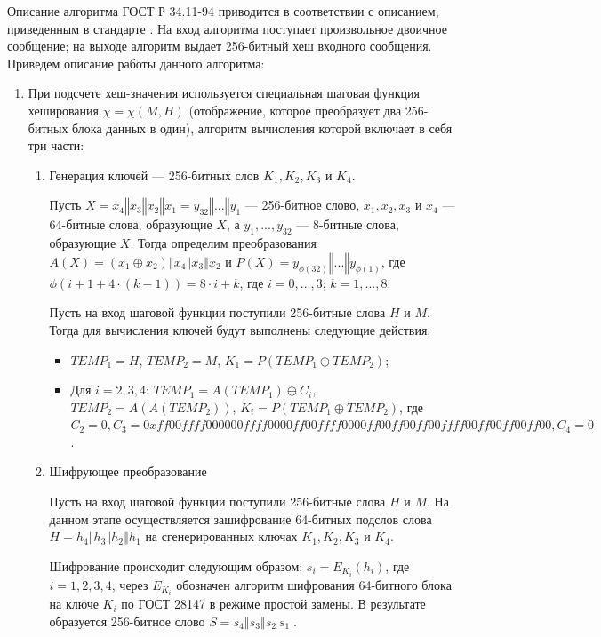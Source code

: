\documentclass{./civarticle}
\begin{document}
Описание алгоритма ГОСТ Р 34.11-94 приводится в соответствии с описанием, приведенным в стандарте \cite{gost94}. На вход алгоритма поступает произвольное двоичное сообщение; на выходе алгоритм выдает 256-битный хеш входного сообщения. Приведем описание работы данного алгоритма:

\begin{enumerate}
    \item При подсчете хеш-значения используется специальная шаговая функция хеширования $\chi = \chi(M, H)$ (отображение, которое преобразует два 256-битных блока данных в один), алгоритм вычисления которой включает в себя три части: 
    \begin{enumerate}
        \item Генерация ключей --- 256-битных слов $K_1, K_2, K_3$ и $K_4$.

        Пусть $X = x_4 \mathbin\Vert x_3 \mathbin\Vert x_2 \mathbin\Vert x_1 = y_{32} \mathbin\Vert ... \mathbin\Vert y_1$ --- 256-битное слово, $x_1, x_2, x_3$ и $x_4$ --- 64-битные слова, образующие $X$, а $y_1, ..., y_{32}$ --- 8-битные слова, образующие $X$. Тогда определим преобразования $A(X) = (x_1 \oplus x_2) \mathbin\Vert x_4 \mathbin\Vert x_3 \mathbin\Vert x_2$ и $P(X) = y_{\phi(32)} \mathbin\Vert ... \mathbin\Vert y_{\phi(1)}$, где $\phi(i+1+4\cdot(k-1)) = 8\cdot i + k$, где $i = 0, ..., 3$; $k = 1, ..., 8$.

        Пусть на вход шаговой функции поступили 256-битные слова $H$ и $M$. Тогда для вычисления ключей будут выполнены следующие действия:

        \begin{itemize}
            \item $TEMP_1 = H$, $TEMP_2 = M$, $K_1 = P(TEMP_1 \oplus TEMP_2)$;
            \item Для $i=2, 3, 4$: $TEMP_1 = A(TEMP_1) \oplus C_i$, $TEMP_2 = A(A(TEMP_2))$, $K_i = P(TEMP_1 \oplus TEMP_2)$, где $C_2 = 0, C_3 = 0xff00ffff000000ffff0000ff00ffff0000ff00ff00ff00ffff00ff00ff00ff00, C_4 = 0$.
        \end{itemize}

        \item Шифрующее преобразование

        Пусть на вход шаговой функции поступили 256-битные слова $H$ и $M$. На данном этапе осуществляется зашифрование 64-битных подслов слова $H = h_4 \mathbin\Vert h_3 \mathbin\Vert h_2 \mathbin\Vert h_1$ на сгенерированных ключах $K_1, K_2, K_3$ и $K_4$.

        Шифрование происходит следующим образом: $s_i = E_{K_i}(h_i)$, где $i = 1, 2, 3, 4$, через $E_{K_i}$ обозначен алгоритм шифрования 64-битного блока на ключе $K_i$ по ГОСТ 28147 в режиме простой замены. В результате образуется 256-битное слово $S = s_4 \mathbin\Vert s_3 \mathbin\Vert s_2 \mathbin s_1$.


\end{enumerate}
\end{enumerate}
\end{document}
